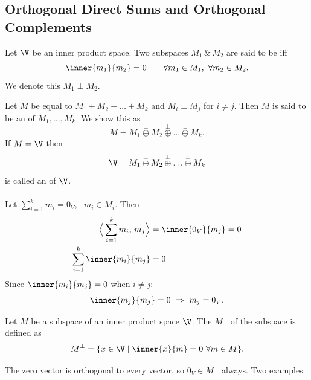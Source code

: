 \subsection{Orthogonal Direct Sums and Orthogonal Complements}\label{ss:orth-complement}

\begin{definition}\leavevmode{}
Let $\V$ be an inner product space. Two subspaces $M_1\,\&\,M_2$ are said to be  iff
\[
\inner{m_1}{m_2}=0 \qquad \forall m_1\in M_1,\ \forall m_2\in M_2 .
\]
We denote this $M_1\perp M_2$.
\end{definition}

\begin{definition}
Let $M$ be equal to $M_1+M_2+\dots+M_k$ and $M_i\perp M_j$ for $i\ne j$. Then $M$ is said to be an  of $M_1,\dots,M_k$. We show this as
\[
M=M_1\overset{\perp}{\oplus}M_2\overset{\perp}{\oplus}\dots\overset{\perp}{\oplus}M_k .
\]
If $M=\V$ then
\[
\V=M_1\overset{\perp}{\oplus}M_2\overset{\perp}{\oplus}\dots\overset{\perp}{\oplus}M_k
\]
is called an  of $\V$.
\end{definition}

\paragraph{}
Let $\sum_{i=1}^{k}m_i=0_V$, \ $m_i\in M_i$. Then
\begin{align*}
\Big\langle\sum_{i=1}^{k}m_i,\,m_j\Big\rangle&=\inner{0_V}{m_j}=0\\
\sum_{i=1}^{k}\inner{m_i}{m_j}&=0
\end{align*}
Since $\inner{m_i}{m_j}=0$ when $i\ne j$:
\[
\inner{m_j}{m_j}=0 \ \Rightarrow\ m_j=0_V .
\]

\begin{definition}
Let $M$ be a subspace of an inner product space $\V$. The  $M^\perp$ of the subspace is defined as
\[
M^\perp=\{x\in\V\mid \inner{x}{m}=0\ \forall m\in M\}.
\]
\end{definition}
The zero vector is orthogonal to every vector, so $0_V\in M^\perp$ always. Two examples:

